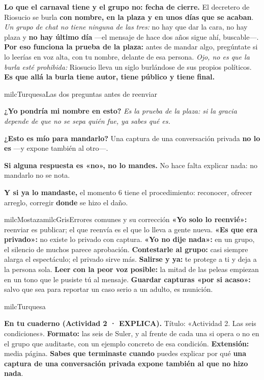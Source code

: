 \documentclass[11pt,letterpaper]{article}
\newcommand{\milcpaso}[3]{%
\Needspace{4\baselineskip}%
\begin{tcolorbox}[enhanced,colback=white,colframe=milcLinea,arc=1.5mm,boxrule=.9pt,
  left=14mm,right=4mm,top=3mm,bottom=3mm,before skip=4pt,after skip=4pt,
  fontupper=\RaggedRight,
  overlay={\node[anchor=north west,circle,fill=#2,text=white,inner sep=0pt,
    minimum size=7.4mm,font=\sffamily\bfseries\small]
    at ([xshift=3.6mm,yshift=-3.2mm]frame.north west) {#1};}]
#3
\end{tcolorbox}}
\begin{document}
\milcpaso{4}{milcTurquesa}{\textbf{Lo que el carnaval tiene y el grupo no: fecha de cierre.} El decretero de Riosucio se burla \textbf{con nombre, en la plaza y en unos días que se acaban}. \emph{Un grupo de chat no tiene ninguna de las tres:} no hay que dar la cara, no hay plaza y \textbf{no hay último día} ---el mensaje de hace dos años sigue ahí, buscable---. \textbf{Por eso funciona la prueba de la plaza:} antes de mandar algo, pregúntate si lo leerías en voz alta, con tu nombre, delante de esa persona. \emph{Ojo, no es que la burla esté prohibida:} Riosucio lleva un siglo burlándose de sus propios políticos. \textbf{Es que allá la burla tiene autor, tiene público y tiene final.}}

\begin{drawbox}{milcTurquesa}{Las dos preguntas antes de reenviar}
\begin{pasoslista}
\item \textbf{¿Yo pondría mi nombre en esto?} \emph{Es la prueba de la plaza: si la gracia depende de que no se sepa quién fue, ya sabes qué es.}
\item \textbf{¿Esto es mío para mandarlo?} Una captura de una conversación privada \textbf{no lo es} ---y expone también al otro---.
\item \textbf{Si alguna respuesta es «no», no lo mandes.} No hace falta explicar nada: no mandarlo no se nota.
\item \textbf{Y si ya lo mandaste,} el momento 6 tiene el procedimiento: reconocer, ofrecer arreglo, corregir \textbf{donde} se hizo el daño.
\end{pasoslista}
\end{drawbox}

\begin{softbox}{milcMostaza}{milcGris}{Errores comunes y su corrección}
\textbf{«Yo solo lo reenvié»:} reenviar es publicar; el que reenvía es el que lo lleva a gente nueva. \textbf{«Es que era privado»:} no existe lo privado con captura. \textbf{«Yo no dije nada»:} en un grupo, el silencio de muchos parece aprobación. \textbf{Contestarle al grupo:} casi siempre alarga el espectáculo; el privado sirve más. \textbf{Salirse y ya:} te protege a ti y deja a la persona sola. \textbf{Leer con la peor voz posible:} la mitad de las peleas empiezan en un tono que le pusiste tú al mensaje. \textbf{Guardar capturas «por si acaso»:} salvo que sea para reportar un caso serio a un adulto, es munición.
\end{softbox}

\begin{infoband}{milcTurquesa}


\textbf{En tu cuaderno (Actividad 2 · EXPLICA).} Título: «Actividad 2. Las seis condiciones». \textbf{Formato:} las seis de Suler, y al frente de cada una si opera o no en el grupo que auditaste, con un ejemplo concreto de esa condición. \textbf{Extensión:} media página. \textbf{Sabes que terminaste cuando} puedes explicar por qué \textbf{una captura de una conversación privada expone también al que no hizo nada}.
\end{infoband}
\end{document}
